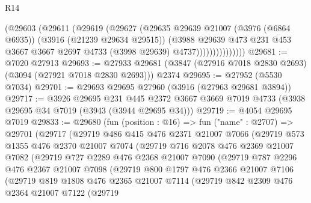 \begin{lexlean}{R14}
\begin{coremodule}
                      (@29603
                        (@29611
                          (@29619
                            (@29627
                              (@29635
                                @29639
                                @21007
                                (@3976 (@6864 @6935))
                                (@3916 (@21239 @29634 @29515))
                                (@3988
                                  @29639
                                  @473
                                  @231
                                  @453
                                  @3667
                                  @3667
                                  @2697
                                  @4733
                                  (@3998 @29639)
                                  @4737)))))))))))))))
@29681 := @7020 @27913
@29693 := @27933 @29681 (@3847 (@27916 @7018 @2830 @2693) (@3094 (@27921 @7018 @2830 @2693))) @2374
@29695 := @27952 (@5530 @7034)
@29701 := @29693 @29695 @27960 (@3916 (@27963 @29681 @3894))
@29717 := @3926
    @29695
    @231
    @445
    @2372
    @3667
    @3669
    @7019
    @4733
    (@3938 @29695 @34 @7019 (@3943 (@3944 @29695 @34)))
@29719 := @4054 @29695 @7019
@29833 := @29680
    (fun (position : @16) =>
    fun ("name" : @2707) =>
    @29701
      (@29717
        (@29719
          @486
          @415
          @476
          @2371
          @21007
          @7066
          (@29719
            @573
            @1355
            @476
            @2370
            @21007
            @7074
            (@29719
              @716
              @2078
              @476
              @2369
              @21007
              @7082
              (@29719
                @727
                @2289
                @476
                @2368
                @21007
                @7090
                (@29719
                  @787
                  @2296
                  @476
                  @2367
                  @21007
                  @7098
                  (@29719
                    @800
                    @1797
                    @476
                    @2366
                    @21007
                    @7106
                    (@29719
                      @819
                      @1808
                      @476
                      @2365
                      @21007
                      @7114
                      (@29719
                        @842
                        @2309
                        @476
                        @2364
                        @21007
                        @7122
                        (@29719

\end{coremodule}
\end{lexlean}
